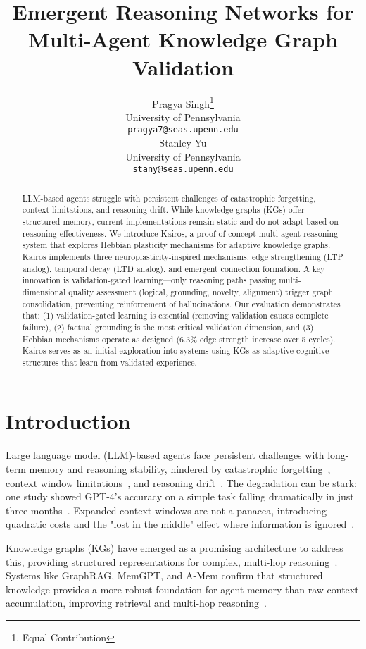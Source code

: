 \documentclass{article}
\title{Emergent Reasoning Networks for Multi-Agent Knowledge Graph Validation}
\author{%
  Pragya Singh\thanks{Equal Contribution}\\
  University of Pennsylvania\\
  \texttt{pragya7@seas.upenn.edu} \\
  \And
  Stanley Yu\footnotemark[1]\\
  University of Pennsylvania \\
  \texttt{stany@seas.upenn.edu} \\
}
\begin{document}
\maketitle


\begin{abstract}
  LLM-based agents struggle with persistent challenges of catastrophic forgetting, context limitations, and reasoning drift. While knowledge graphs (KGs) offer structured memory, current implementations remain static and do not adapt based on reasoning effectiveness. We introduce Kairos, a proof-of-concept multi-agent reasoning system that explores Hebbian plasticity mechanisms for adaptive knowledge graphs. Kairos implements three neuroplasticity-inspired mechanisms: edge strengthening (LTP analog), temporal decay (LTD analog), and emergent connection formation. A key innovation is validation-gated learning—only reasoning paths passing multi-dimensional quality assessment (logical, grounding, novelty, alignment) trigger graph consolidation, preventing reinforcement of hallucinations. Our evaluation demonstrates that: (1) validation-gated learning is essential (removing validation causes complete failure), (2) factual grounding is the most critical validation dimension, and (3) Hebbian mechanisms operate as designed (6.3\% edge strength increase over 5 cycles). Kairos serves as an initial exploration into systems using KGs as adaptive cognitive structures that learn from validated experience.
\end{abstract}

\section{Introduction}

Large language model (LLM)-based agents face persistent challenges with long-term memory and reasoning stability, hindered by catastrophic forgetting~\citep{li-etal-2024-revisiting,luo2023empirical}, context window limitations~\citep{packer2023memgpt}, and reasoning drift~\citep{chen2023chatgpt}. The degradation can be stark: one study showed GPT-4's accuracy on a simple task falling dramatically in just three months~\citep{chen2023chatgpt}. Expanded context windows are not a panacea, introducing quadratic costs and the "lost in the middle" effect where information is ignored~\citep{packer2023memgpt}.

Knowledge graphs (KGs) have emerged as a promising architecture to address this, providing structured representations for complex, multi-hop reasoning~\citep{pan2024unifying}. Systems like GraphRAG, MemGPT, and A-Mem confirm that structured knowledge provides a more robust foundation for agent memory than raw context accumulation, improving retrieval and multi-hop reasoning~\citep{edge2024graphrag,packer2023memgpt,xu2025amem}.
\end{document}
